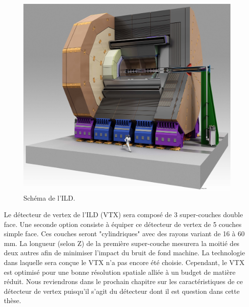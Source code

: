   \begin{figure}[!htb]
    \begin{center} 
      \includegraphics[scale=0.12]{./figures/ILD_schema_global.jpg}
      \caption{Sch\'ema de l'ILD.}
      \label{fig:ILDschema}
    \end{center}
  \end{figure}

  \medskip
  
  Le d\'etecteur de vertex de l'ILD (VTX) sera compos\'e de 3 super-couches double face. Une seconde option consiste à \'equiper ce d\'etecteur de vertex de 5 couches simple face. Ces couches seront "cylindriques" avec des rayons variant de 16 \`a 60 mm. La longueur (selon Z) de la premi\`ere super-couche mesurera la moiti\'e des deux autres afin de minimiser l'impact du bruit de fond machine. La technologie dans laquelle sera con\c{c}ue le VTX n'a pas encore \'et\'e choisie. Cependant, le VTX est optimis\'e pour une bonne r\'esolution spatiale alli\'ee \`a un budget de mati\`ere r\'eduit. Nous reviendrons dans le prochain chapitre sur les caract\'eristiques de ce d\'etecteur de vertex puisqu'il s'agit du d\'etecteur dont il est question dans cette th\`ese. 

